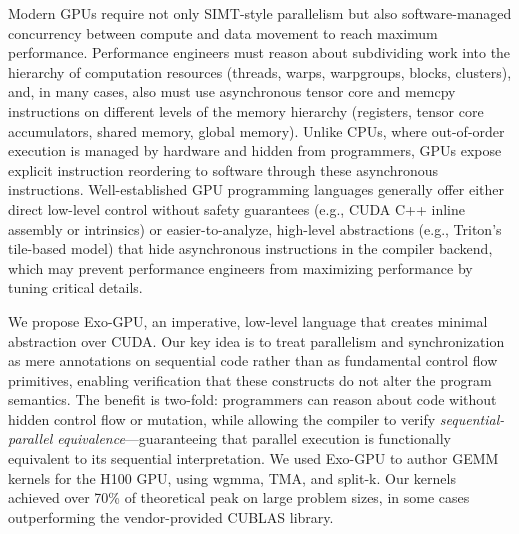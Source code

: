 Modern GPUs require not only SIMT-style parallelism but also software-managed concurrency between compute and data movement to reach maximum performance. Performance engineers must reason about subdividing work into the hierarchy of computation resources (threads, warps, warpgroups, blocks, clusters), and, in many cases, also must use asynchronous tensor core and memcpy instructions on different levels of the memory hierarchy (registers, tensor core accumulators, shared memory, global memory).
Unlike CPUs, where out-of-order execution is managed by hardware and hidden from programmers, GPUs expose explicit instruction reordering to software through these asynchronous instructions.
Well-established GPU programming languages generally offer either direct low-level control without safety guarantees (e.g., CUDA C++ inline assembly or intrinsics) or easier-to-analyze, high-level abstractions (e.g., Triton’s tile-based model) that hide asynchronous instructions in the compiler backend, which may prevent performance engineers from maximizing performance by tuning critical details.


We propose Exo-GPU, an imperative, low-level language that creates minimal abstraction over CUDA.
Our key idea is to treat parallelism and synchronization as mere annotations on sequential code rather than as fundamental control flow primitives, enabling verification that these constructs do not alter the program semantics.
The benefit is two-fold: programmers can reason about code without hidden control flow or mutation, while allowing the \sporkName{} compiler to verify \emph{sequential-parallel equivalence}---guaranteeing that parallel execution is functionally equivalent to its sequential interpretation.
We used Exo-GPU to author GEMM kernels for the H100 GPU, using wgmma, TMA, and split-k.
Our kernels achieved over 70\% of theoretical peak on large problem sizes, in some cases outperforming the vendor-provided CUBLAS library.
